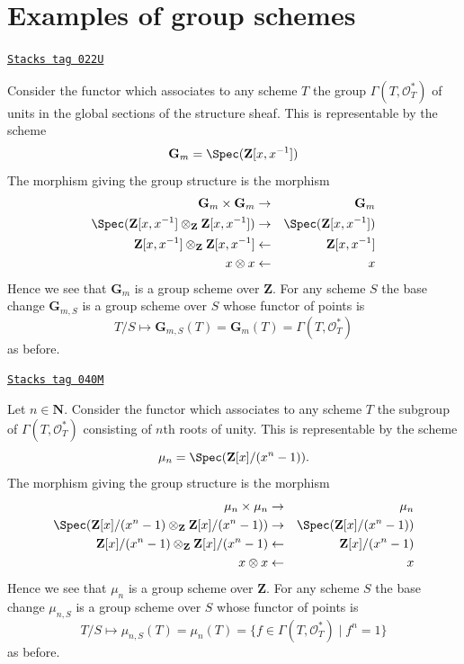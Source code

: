 \section{Examples of group schemes}
\label{groupoids-section-examples-group-schemes}
\begin{example}

\label{groupoids-example-multiplicative-group}
\href{https://stacks.math.columbia.edu/tag/022U}{\texttt{Stacks tag 022U}}

Consider the functor which associates
to any scheme $T$ the group $\Gamma(T, \mathcal{O}_T^*)$
of units in the global sections of the structure sheaf.
This is representable by the scheme
$$
\mathbf{G}_m = \Spec(\mathbf{Z}[x, x^{-1}])
$$
The morphism giving the group structure is the morphism
\begin{eqnarray*}
\mathbf{G}_m \times \mathbf{G}_m & \to & \mathbf{G}_m \\
\Spec(\mathbf{Z}[x, x^{-1}] \otimes_{\mathbf{Z}} \mathbf{Z}[x, x^{-1}])
& \to &
\Spec(\mathbf{Z}[x, x^{-1}]) \\
\mathbf{Z}[x, x^{-1}] \otimes_{\mathbf{Z}} \mathbf{Z}[x, x^{-1}]
& \leftarrow &
\mathbf{Z}[x, x^{-1}] \\
x \otimes x & \leftarrow & x
\end{eqnarray*}
Hence we see that $\mathbf{G}_m$ is a group scheme over $\mathbf{Z}$.
For any scheme $S$ the base change $\mathbf{G}_{m, S}$ is a
group scheme over $S$ whose functor of points is
$$
T/S
\longmapsto
\mathbf{G}_{m, S}(T) = \mathbf{G}_m(T) = \Gamma(T, \mathcal{O}_T^*)
$$
as before.
\end{example}

\begin{example}

\label{groupoids-example-roots-of-unity}
\href{https://stacks.math.columbia.edu/tag/040M}{\texttt{Stacks tag 040M}}

Let $n \in \mathbf{N}$.
Consider the functor which associates
to any scheme $T$ the subgroup of $\Gamma(T, \mathcal{O}_T^*)$
consisting of $n$th roots of unity.
This is representable by the scheme
$$
\mu_n = \Spec(\mathbf{Z}[x]/(x^n - 1)).
$$
The morphism giving the group structure is the morphism
\begin{eqnarray*}
\mu_n \times \mu_n & \to & \mu_n \\
\Spec(
\mathbf{Z}[x]/(x^n - 1)
\otimes_{\mathbf{Z}}
\mathbf{Z}[x]/(x^n - 1))
& \to &
\Spec(\mathbf{Z}[x]/(x^n - 1)) \\
\mathbf{Z}[x]/(x^n - 1) \otimes_{\mathbf{Z}} \mathbf{Z}[x]/(x^n - 1)
& \leftarrow &
\mathbf{Z}[x]/(x^n - 1) \\
x \otimes x & \leftarrow & x
\end{eqnarray*}
Hence we see that $\mu_n$ is a group scheme over $\mathbf{Z}$.
For any scheme $S$ the base change $\mu_{n, S}$ is a
group scheme over $S$ whose functor of points is
$$
T/S
\longmapsto
\mu_{n, S}(T) = \mu_n(T) = \{f \in \Gamma(T, \mathcal{O}_T^*) \mid f^n = 1\}
$$
as before.
\end{example}


